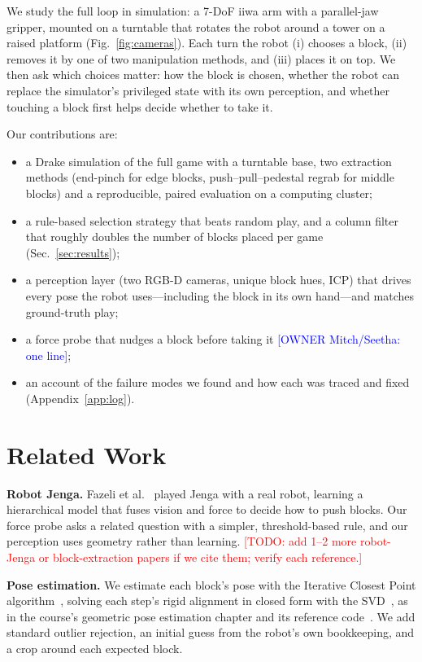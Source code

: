 \documentclass[conference]{IEEEtran}
\newcommand{\todo}[1]{\textcolor{red}{[TODO: #1]}}
\newcommand{\owner}[2]{\textcolor{blue}{[OWNER #1: #2]}}
\begin{document}
We study the full loop in simulation: a 7-DoF iiwa arm with a parallel-jaw gripper, mounted on a turntable that rotates
the robot around a tower on a raised platform (Fig.~\ref{fig:cameras}). Each turn the robot (i) chooses a block, (ii)
removes it by one of two manipulation methods, and (iii) places it on top. We then ask which choices matter: how the
block is chosen, whether the robot can replace the simulator's privileged state with its own perception, and whether
touching a block first helps decide whether to take it.

Our contributions are:
\begin{itemize}
\item a Drake simulation of the full game with a turntable base, two extraction methods (end-pinch for edge blocks,
push--pull--pedestal regrab for middle blocks) and a reproducible, paired evaluation on a computing cluster;
\item a rule-based selection strategy that beats random play, and a column filter that roughly doubles the number of
blocks placed per game (Sec.~\ref{sec:results});
\item a perception layer (two RGB-D cameras, unique block hues, ICP) that drives every pose the robot uses---including
the block in its own hand---and matches ground-truth play;
\item a force probe that nudges a block before taking it \owner{Mitch/Seetha}{one line};
\item an account of the failure modes we found and how each was traced and fixed (Appendix~\ref{app:log}).
\end{itemize}

\section{Related Work}
\textbf{Robot Jenga.} Fazeli et al.~\cite{fazeli2019} played Jenga with a real robot, learning a hierarchical model
that fuses vision and force to decide how to push blocks. Our force probe asks a related question with a simpler,
threshold-based rule, and our perception uses geometry rather than learning. \todo{add 1--2 more robot-Jenga or
block-extraction papers if we cite them; verify each reference.}

\textbf{Pose estimation.} We estimate each block's pose with the Iterative Closest Point algorithm~\cite{besl1992},
solving each step's rigid alignment in closed form with the SVD~\cite{arun1987}, as in the course's geometric pose
estimation chapter and its reference code~\cite{tedrake_manip}. We add standard outlier rejection, an initial guess from
the robot's own bookkeeping, and a crop around each expected block.
\end{document}
